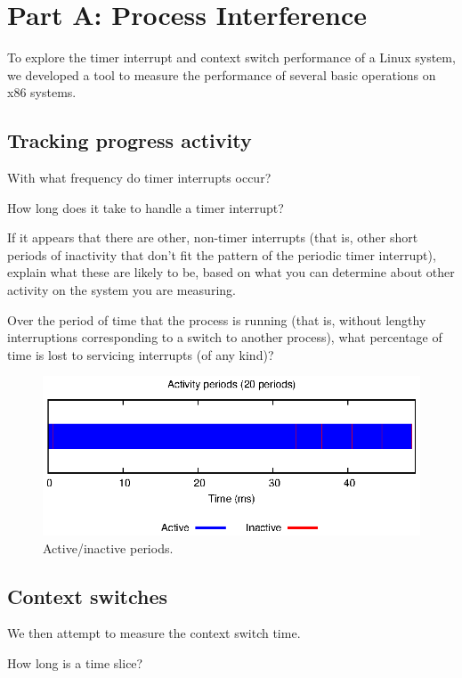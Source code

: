 \documentclass[11pt,twoside]{article}
\begin{document}
\section{Part A: Process Interference}
To explore the timer interrupt and context switch performance of a Linux system, we developed a tool to measure the performance of several basic operations on x86 systems.


\subsection{Tracking progress activity}

With what frequency do timer interrupts occur?

How long does it take to handle a timer interrupt?

If it appears that there are other, non-timer interrupts (that is, other short periods of inactivity that don't fit the pattern of the periodic timer interrupt), explain what these are likely to be, based on what you can determine about other activity on the system you are measuring.

Over the period of time that the process is running (that is, without lengthy interruptions corresponding to a switch to another process), what percentage of time is lost to servicing interrupts (of any kind)?

\begin{figure}
    \centering
    \includegraphics[width=\textwidth]{parta_activity}
    \caption{Active/inactive periods.}
    \label{fig:activity}
\end{figure}


\subsection{Context switches}
We then attempt to measure the context switch time.

How long is a time slice? 
\end{document}
